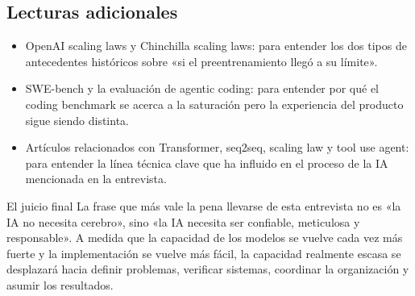 \subsection{Lecturas adicionales}

\begin{itemize}
\item OpenAI scaling laws y Chinchilla scaling laws: para entender los dos tipos de antecedentes históricos sobre «si el preentrenamiento llegó a su límite».
\item SWE-bench y la evaluación de agentic coding: para entender por qué el coding benchmark se acerca a la saturación pero la experiencia del producto sigue siendo distinta.
\item Artículos relacionados con Transformer, seq2seq, scaling law y tool use agent: para entender la línea técnica clave que ha influido en el proceso de la IA mencionada en la entrevista.
\end{itemize}

\begin{importantbox}{El juicio final}
La frase que más vale la pena llevarse de esta entrevista no es «la IA no necesita cerebro», sino «la IA necesita ser confiable, meticulosa y responsable». A medida que la capacidad de los modelos se vuelve cada vez más fuerte y la implementación se vuelve más fácil, la capacidad realmente escasa se desplazará hacia definir problemas, verificar sistemas, coordinar la organización y asumir los resultados.
\end{importantbox}


